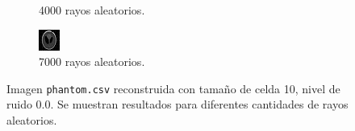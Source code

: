 \documentclass{beamer}
\begin{document}
\begin{frame}
\begin{figure}
\begin{subfigure}{0.4\linewidth}
  \caption{4000 rayos aleatorios.}
\end{subfigure}%
\begin{subfigure}{0.4\linewidth}
  \centering
  \includegraphics[width=0.6\linewidth]{rayos/phantom-aleat7000}
  \caption{7000 rayos aleatorios.}
\end{subfigure}%

\caption{Imagen \texttt{phantom.csv} reconstruida con tamaño de celda 10, nivel de ruido 0.0. Se 
muestran resultados para diferentes cantidades de rayos aleatorios.}
\label{fig:muestras_aleat}
\end{figure}
\end{frame}
\end{document}
